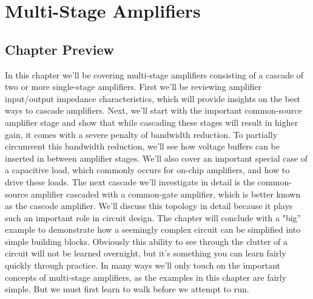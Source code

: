 \chapter{Multi-Stage Amplifiers}
\label{ch:ch15_multi_stage_amps}
\graphicspath{{./figs_multistage/}}
\newcommand{\topicA}{Review Amplifier Input/Output Impedance Characteristics}
\newcommand{\topicB}{Common-Source Cascades}
\newcommand{\topicC}{Common-Source with Capacitive Load}
\newcommand{\topicD}{Common-Source Common-Gate Cascade (Cascode)}
\newcommand{\topicE}{"Big Circuit" Example}
\section{Chapter Preview}
In this chapter we'll be covering multi-stage amplifiers consisting of a cascade of two or more single-stage amplifiers.  First we'll be reviewing amplifier input/output impedance characteristics, which will provide insights on the best ways to cascade amplifiers.  Next, we'll start with the important common-source amplifier stage and show that while cascading these stages will result in higher gain, it comes with a severe penalty of bandwidth reduction.  To partially circumvent this bandwidth reduction, we'll see how voltage buffers can be inserted in between amplifier stages.  We'll also cover an important special case of a capacitive load, which commonly occurs for on-chip amplifiers, and how to drive these loads.  The next cascade we'll investigate in detail is the common-source amplifier cascaded with a common-gate amplifier, which is better known as the cascode amplifier.  We'll discuss this topology in detail because it plays such an important role in circuit design.  The chapter will conclude with a "big'' example to demonstrate how a seemingly complex circuit can be simplified into simple building blocks.  Obviously this ability to see through the clutter of a circuit will not be learned overnight, but it's something you can learn fairly quickly through practice.  In many ways we'll only touch on the important concepts of multi-stage amplifiers, as the examples in this chapter are fairly simple.  But we must first learn to walk before we attempt to run.
